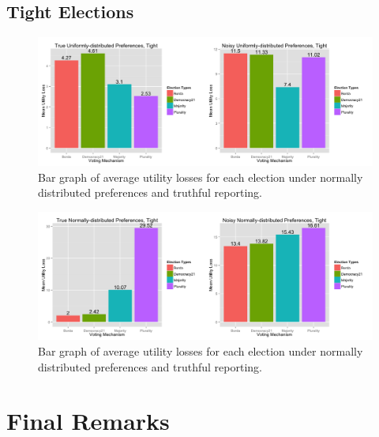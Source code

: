 \documentclass[11pt]{scrartcl}
\begin{document}
\subsection{Tight Elections}

\begin{figure}[H]\center
\includegraphics[scale=0.38]{uniform_tight.png}
\caption{Bar graph of average utility losses for each election under normally distributed preferences and truthful reporting.}
\end{figure}

\begin{figure}[H]\center
\includegraphics[scale=0.38]{normal_tight.png}
\caption{Bar graph of average utility losses for each election under normally distributed preferences and truthful reporting.}
\end{figure}


\section{Final Remarks}
\end{document}
